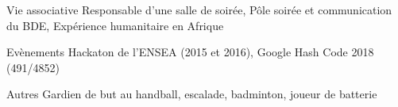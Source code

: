 

\begin{cvskills}

  \cvskill
    {Vie associative} %
    {Responsable d'une salle de soirée, Pôle soirée et communication du BDE, Expérience humanitaire en Afrique} %

  \cvskill
    {Evènements} %
    {Hackaton de l'ENSEA (2015 et 2016), Google Hash Code 2018 (491/4852)} %

  \cvskill
    {Autres} %
    {Gardien de but au handball, escalade, badminton, joueur de batterie} %
    

\end{cvskills}